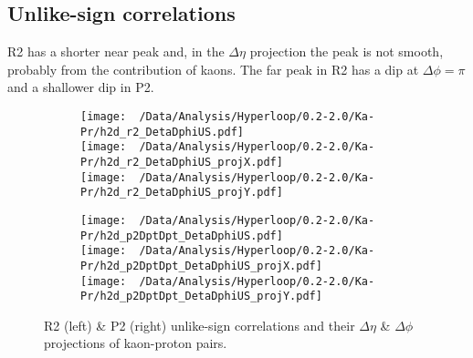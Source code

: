 \documentclass[12pt,a4paper,twoside]{report}
\begin{document}
\subsection{Unlike-sign correlations}
R2 has a shorter near peak and, in the $\Delta\eta$ projection the peak is not smooth, probably from the contribution of kaons. The far peak in R2 has a dip at $\Delta\phi=\pi$ and a shallower dip in P2.
\begin{figure}[H]
	\begin{subfigure}{0.49\linewidth}
		\texttt{[image: ~/Data/Analysis/Hyperloop/0.2-2.0/Ka-Pr/h2d\_r2\_DetaDphiUS.pdf]}\\
		\texttt{[image: ~/Data/Analysis/Hyperloop/0.2-2.0/Ka-Pr/h2d\_r2\_DetaDphiUS\_projX.pdf]}\\
		\texttt{[image: ~/Data/Analysis/Hyperloop/0.2-2.0/Ka-Pr/h2d\_r2\_DetaDphiUS\_projY.pdf]}\\
	\end{subfigure}
	\begin{subfigure}{0.49\linewidth}
		\texttt{[image: ~/Data/Analysis/Hyperloop/0.2-2.0/Ka-Pr/h2d\_p2DptDpt\_DetaDphiUS.pdf]}\\
		\texttt{[image: ~/Data/Analysis/Hyperloop/0.2-2.0/Ka-Pr/h2d\_p2DptDpt\_DetaDphiUS\_projX.pdf]}\\
		\texttt{[image: ~/Data/Analysis/Hyperloop/0.2-2.0/Ka-Pr/h2d\_p2DptDpt\_DetaDphiUS\_projY.pdf]}\\
	\end{subfigure}
	\caption{R2 (left) \& P2 (right) unlike-sign correlations and their $\Delta\eta$ \& $\Delta\phi$ projections of kaon-proton pairs.}
\end{figure}
\end{document}
